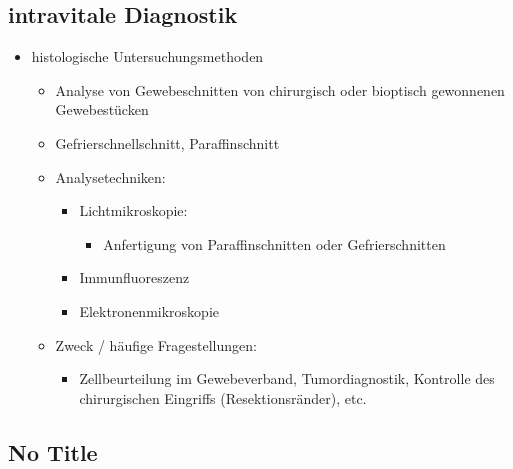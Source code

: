 \subsection{intravitale Diagnostik}
	\begin{itemize}
		\item histologische Untersuchungsmethoden
			\begin{itemize}
				\item Analyse von Gewebeschnitten von chirurgisch oder bioptisch gewonnenen Gewebestücken
				\item Gefrierschnellschnitt, Paraffinschnitt
				\item Analysetechniken:
					\begin{itemize}
						\item Lichtmikroskopie:
							\begin{itemize}
								\item Anfertigung von Paraffinschnitten oder Gefrierschnitten
							\end{itemize}
						\item Immunfluoreszenz
						\item Elektronenmikroskopie
					\end{itemize}
		\item Zweck / häufige Fragestellungen:
			\begin{itemize}
				\item Zellbeurteilung im Gewebeverband, Tumordiagnostik, Kontrolle des chirurgischen Eingriffs (Resektionsränder), etc.
			\end{itemize}
		\end{itemize}
	\end{itemize}

\subsection{No Title}

